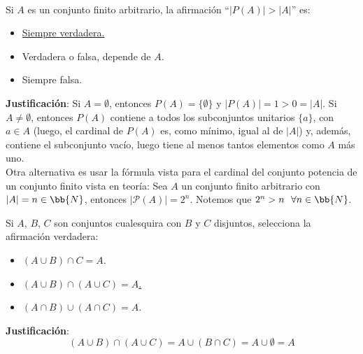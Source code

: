 \documentclass[12pt]{article}
\newcounter{ejercicio}[section] %
\newcounter{ejercicio}
\newcommand{\resetearcontador}{%
  \setcounter{ejercicio}{0} %
}
\begin{document}
    \newpage
    \ %
    \resetearcontador

    \begin{ejercicio}
        Si $A$ es un conjunto finito arbitrario, la afirmación ``$|P(A)| > |A|$'' es:
        \begin{itemize}
            \item \underline{Siempre verdadera.}
            \item Verdadera o falsa, depende de $A$.
            \item Siempre falsa.
        \end{itemize}

        \noindent
        \textbf{Justificación}:
        Si $A = \emptyset$, entonces $P(A) = \{\emptyset\}$ y $|P(A)|=1>0=|A|$.\newline
        Si $A \neq \emptyset$, entonces $P(A)$ contiene a todos los subconjuntos unitarios $\{a\}$, con $a \in A$ (luego, el cardinal de $P(A)$ es, como mínimo, igual al de $|A|$) y, además, contiene el subconjunto vacío, luego tiene al menos tantos elementos como $A$ más uno.\\

        \noindent
        Otra alternativa es usar la fórmula vista para el cardinal del conjunto potencia de un conjunto finito vista en teoría:\newline
        Sea $A$ un conjunto finito arbitrario con $|A| = n \in \bb{N}$, entonces $|\mathcal{P}(A)| = 2^n$.\newline
        Notemos que $2^n > n~~\forall n \in \bb{N}$.
    \end{ejercicio}

    \begin{ejercicio}
        Si $A$, $B$, $C$ son conjuntos cualesquira con $B$ y $C$ disjuntos, selecciona la afirmación verdadera:
        \begin{itemize}
            \item $(A \cup B)\cap C = A$.
            \item \underline{$(A \cup B)\cap (A \cup C)=A$.}
            \item $(A\cap B)\cup(A \cap C)=A$.
        \end{itemize}

        \noindent
        \textbf{Justificación}:
        $$(A \cup B) \cap (A \cup C) = A \cup (B \cap C) = A \cup \emptyset = A$$
    \end{ejercicio}
\end{document}
